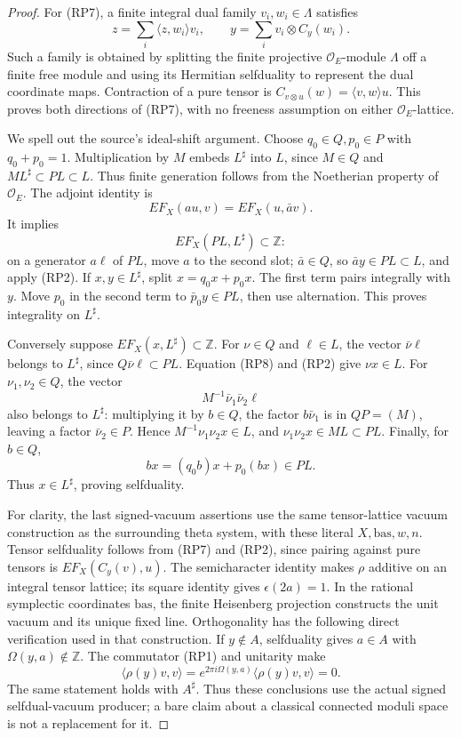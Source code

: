 \begin{proof}
For (RP7), a finite integral dual family \(v_i,w_i\in\Lambda\)
satisfies
\[
 z=\sum_i\langle z,w_i\rangle v_i,\qquad
                      y=\sum_i v_i\otimes C_y(w_i).
\]
Such a family is obtained by splitting the finite projective
\(\mathcal O_E\)-module \(\Lambda\) off a finite free module and
using its Hermitian selfduality to represent the dual coordinate
maps. Contraction of a pure tensor is
\(C_{v\otimes u}(w)=\langle v,w\rangle u\).
This proves both directions of (RP7), with no freeness assumption
on either \(\mathcal O_E\)-lattice.

We spell out the source's ideal-shift argument. Choose
\(q_0\in Q,p_0\in P\) with \(q_0+p_0=1\). Multiplication by \(M\)
embeds \(L^\sharp\) into \(L\), since \(M\in Q\) and
\(ML^\sharp\subset PL\subset L\). Thus finite generation follows
from the Noetherian property of \(\mathcal O_E\).
The adjoint identity is
\[
                 EF_X(au,v)=EF_X(u,\bar a v).              \tag{RP8}
\]
It implies
\[
                        EF_X(PL,L^\sharp)\subset\mathbb Z:
\]
on a generator \(a\ell\) of \(PL\), move \(a\) to the second
slot; \(\bar a\in Q\), so \(\bar a y\in PL\subset L\), and
apply (RP2). If \(x,y\in L^\sharp\), split \(x=q_0x+p_0x\).
The first term pairs integrally with \(y\). Move \(p_0\) in the
second term to \(\bar p_0y\in PL\), then use alternation.
This proves integrality on \(L^\sharp\).

Conversely suppose \(EF_X(x,L^\sharp)\subset\mathbb Z\).
For \(\nu\in Q\) and \(\ell\in L\), the vector
\(\bar\nu\ell\) belongs to \(L^\sharp\), since
\(Q\bar\nu\ell\subset PL\). Equation (RP8) and (RP2) give
\(\nu x\in L\). For \(\nu_1,\nu_2\in Q\), the vector
\[
                M^{-1}\bar\nu_1\bar\nu_2\ell
\]
also belongs to \(L^\sharp\): multiplying it by \(b\in Q\),
the factor \(b\bar\nu_1\) is in \(QP=(M)\), leaving a factor
\(\bar\nu_2\in P\). Hence
\(M^{-1}\nu_1\nu_2x\in L\), and
\(\nu_1\nu_2x\in ML\subset PL\). Finally, for \(b\in Q\),
\[
                   bx=(q_0b)x+p_0(bx)\in PL.
\]
Thus \(x\in L^\sharp\), proving selfduality.

For clarity, the last signed-vacuum assertions use the same
tensor-lattice vacuum construction as the surrounding theta
system, with these literal \(X,\mathrm{bas},w,n\).
Tensor selfduality follows from (RP7) and (RP2), since pairing
against pure tensors is \(EF_X(C_y(v),u)\). The semicharacter
identity makes \(\rho\) additive on an integral tensor lattice;
its square identity gives \(\epsilon(2a)=1\).
In the rational symplectic coordinates \(\mathrm{bas}\), the
finite Heisenberg projection constructs the unit vacuum and
its unique fixed line. Orthogonality has the following direct
verification used in that construction. If \(y\notin A\),
selfduality gives \(a\in A\) with \(\Omega(y,a)\notin\mathbb Z\).
The commutator (RP1) and unitarity make
\[
 \langle\rho(y)v,v\rangle
          =e^{2\pi i\Omega(y,a)}\langle\rho(y)v,v\rangle=0.
\]
The same statement holds with \(A^\sharp\).
Thus these conclusions use the actual signed selfdual-vacuum
producer; a bare claim about a classical connected moduli space
is not a replacement for it.
\end{proof}

